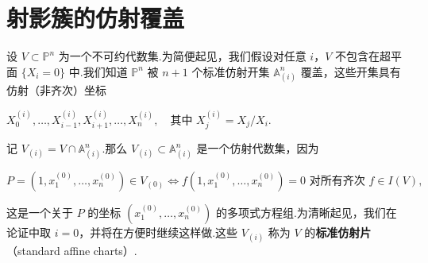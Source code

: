 \section{射影簇的仿射覆盖}

设 \(V \subset {\mathbb{P}}^n\) 为一个不可约代数集.为简便起见，我们假设对任意 \(i\)，\(V\) 不包含在超平面 \(\{X_i = 0\}\) 中.我们知道 \({\mathbb{P}}^n\) 被 \(n+1\) 个标准仿射开集 \({\mathbb{A}}_{(i)}^n\) 覆盖，这些开集具有仿射（非齐次）坐标

\(
X_0^{(i)}, \ldots, X_{i-1}^{(i)}, X_{i+1}^{(i)}, \ldots, X_n^{(i)}, \quad \text{其中 } X_j^{(i)} = X_j/X_i.
\)

记 \(V_{(i)} = V \cap {\mathbb{A}}_{(i)}^n\).那么 \(V_{(i)} \subset {\mathbb{A}}_{(i)}^n\) 是一个仿射代数集，因为

\(
P = (1, x_1^{(0)}, \ldots, x_n^{(0)}) \in V_{(0)} \Leftrightarrow f(1, x_1^{(0)}, \ldots, x_n^{(0)}) = 0 \text{ 对所有齐次 } f \in I(V),
\)

这是一个关于 \(P\) 的坐标 \((x_1^{(0)}, \ldots, x_n^{(0)})\) 的多项式方程组.为清晰起见，我们在论证中取 \(i=0\)，并将在方便时继续这样做.这些 \(V_{(i)}\) 称为 \(V\) 的\textbf{标准仿射片}（standard affine charts）.

